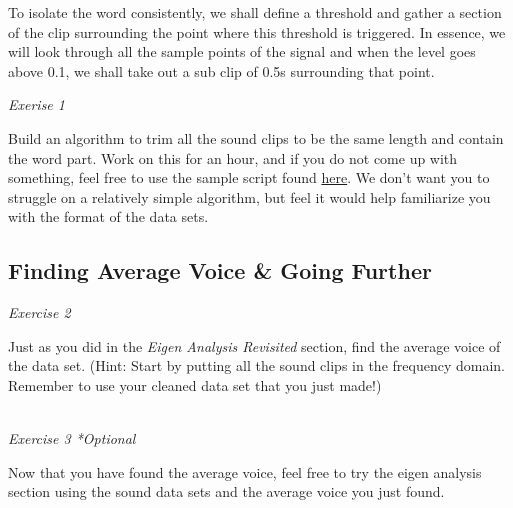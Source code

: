 \documentclass{tufte-handout}
\begin{document}
To isolate the word consistently, we shall define a threshold and gather a section of the clip surrounding the point where this threshold is triggered. In essence, we will look through all the sample points of the signal and when the level goes above 0.1, we shall take out a sub clip of 0.5s surrounding that point. 


\textit{Exerise 1}

Build an algorithm to trim all the sound clips to be the same length and contain the word part. Work on this for an hour, and if you do not come up with something, feel free to use the sample script found \href{#}{here}. We don't want you to struggle on a relatively simple algorithm, but feel it would help familiarize you with the format of the data sets. 

\subsection{Finding Average Voice & Going Further}
\textit{Exercise 2}

Just as you did in the \textit{Eigen Analysis Revisited} section, find the average voice of the data set. (Hint: Start by putting all the sound clips in the frequency domain. Remember to use your cleaned data set that you just made!)

\\
\textit{Exercise 3 *Optional}

Now that you have found the average voice, feel free to try the eigen analysis section using the sound data sets and the average voice you just found. 
\end{document}
